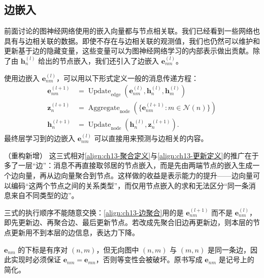 \documentclass[../../main.tex]{subfiles}
\begin{document}
\subsection{边嵌入}\label{subsection:ch13-边嵌入}

前面讨论的图神经网络使用的嵌入向量都与节点相关联。我们已经看到一些网络也具有与边相关联的数据。即使不存在与边相关联的观测值，我们也仍然可以维护和更新基于边的隐藏变量，这些变量可以为图神经网络学习的内部表示做出贡献。除了由 $\bm{h}_n^{(l)}$ 给出的节点嵌入，我们还引入了边嵌入 $\bm{e}_{nm}^{(l)}$。

\begin{definition}[带边嵌入的消息传递]\label{definition:ch13-边嵌入消息传递}
使用边嵌入 $\bm{e}_{nm}^{(l)}$，可以用以下形式定义一般的消息传递方程：
\begin{align}
\bm{e}_{nm}^{(l+1)}&=\operatorname{Update}_{\mathrm{edge}}\!\left(\bm{e}_{nm}^{(l)},\bm{h}_n^{(l)},\bm{h}_m^{(l)}\right)
\label{align:ch13-边更新}\\
\bm{z}_n^{(l+1)}&=\operatorname{Aggregate}_{\mathrm{node}}\!\left(\{\bm{e}_{nm}^{(l+1)}:m\in\mathcal{N}(n)\}\right)
\label{align:ch13-边聚合}\\
\bm{h}_n^{(l+1)}&=\operatorname{Update}_{\mathrm{node}}\!\left(\bm{h}_n^{(l)},\bm{z}_n^{(l+1)}\right).
\label{align:ch13-边节点更新}
\end{align}
最终层学习到的边嵌入 $\bm{e}_{nm}^{(l)}$ 可以直接用来预测与边相关的内容。
\end{definition}

\begin{remark}（重构新增）
这三式相对\eqref{align:ch13-聚合定义}与\eqref{align:ch13-更新定义}的推广在于多了一层“边”：消息不再直接取邻居的节点嵌入，而是先由两端节点的嵌入生成一个边向量，再从边向量聚合到节点。这样做的收益是表示能力的提升——边向量可以编码“这两个节点之间的关系类型”，而仅用节点嵌入的求和无法区分“同一条消息来自不同类型的边”。\par
三式的执行顺序不能随意交换：\eqref{align:ch13-边聚合}用的是 $\bm{e}_{nm}^{(l+1)}$ 而不是 $\bm{e}_{nm}^{(l)}$，即先更新边、再聚合边、最后更新节点。若改成先聚合旧边再更新边，则本层的节点更新用不到本层的边信息，表达力下降。\par
$\bm{e}_{nm}$ 的下标是有序对 $(n,m)$，但无向图中 $(n,m)$ 与 $(m,n)$ 是同一条边，因此实现时必须保证 $\bm{e}_{nm}=\bm{e}_{mn}$，否则等变性会被破坏。原书写成 $\bm{e}_{nm}$ 是记号上的简化。
\end{remark}
\end{document}
